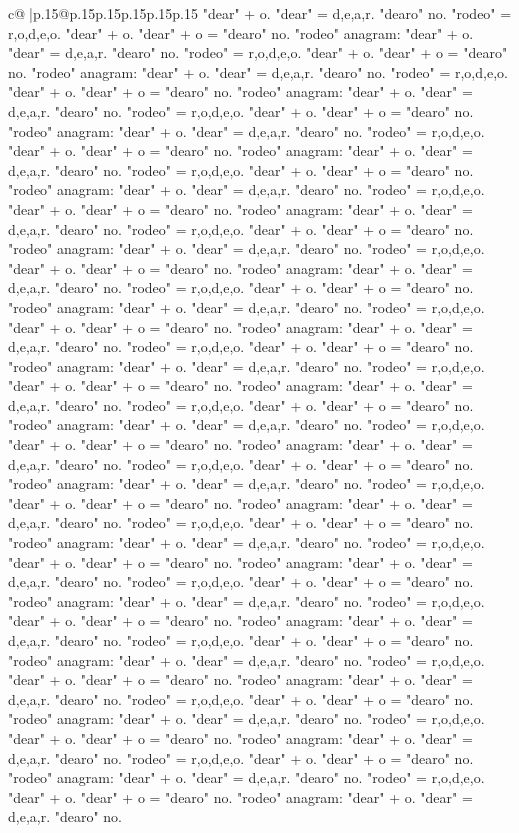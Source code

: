 \documentclass{article}
\begin{document}
{\begin{supertabular}{c@{$\;$}|p{.15\linewidth}@{}p{.15\linewidth}p{.15\linewidth}p{.15\linewidth}p{.15\linewidth}p{.15\linewidth}}
{{{"dear" + o. "dear" = d,e,a,r. "dearo" no. "rodeo" = r,o,d,e,o. "dear" + o. "dear" + o = "dearo" no. "rodeo" anagram: "dear" + o. "dear" = d,e,a,r. "dearo" no. "rodeo" = r,o,d,e,o. "dear" + o. "dear" + o = "dearo" no. "rodeo" anagram: "dear" + o. "dear" = d,e,a,r. "dearo" no. "rodeo" = r,o,d,e,o. "dear" + o. "dear" + o = "dearo" no. "rodeo" anagram: "dear" + o. "dear" = d,e,a,r. "dearo" no. "rodeo" = r,o,d,e,o. "dear" + o. "dear" + o = "dearo" no. "rodeo" anagram: "dear" + o. "dear" = d,e,a,r. "dearo" no. "rodeo" = r,o,d,e,o. "dear" + o. "dear" + o = "dearo" no. "rodeo" anagram: "dear" + o. "dear" = d,e,a,r. "dearo" no. "rodeo" = r,o,d,e,o. "dear" + o. "dear" + o = "dearo" no. "rodeo" anagram: "dear" + o. "dear" = d,e,a,r. "dearo" no. "rodeo" = r,o,d,e,o. "dear" + o. "dear" + o = "dearo" no. "rodeo" anagram: "dear" + o. "dear" = d,e,a,r. "dearo" no. "rodeo" = r,o,d,e,o. "dear" + o. "dear" + o = "dearo" no. "rodeo" anagram: "dear" + o. "dear" = d,e,a,r. "dearo" no. "rodeo" = r,o,d,e,o. "dear" + o. "dear" + o = "dearo" no. "rodeo" anagram: "dear" + o. "dear" = d,e,a,r. "dearo" no. "rodeo" = r,o,d,e,o. "dear" + o. "dear" + o = "dearo" no. "rodeo" anagram: "dear" + o. "dear" = d,e,a,r. "dearo" no. "rodeo" = r,o,d,e,o. "dear" + o. "dear" + o = "dearo" no. "rodeo" anagram: "dear" + o. "dear" = d,e,a,r. "dearo" no. "rodeo" = r,o,d,e,o. "dear" + o. "dear" + o = "dearo" no. "rodeo" anagram: "dear" + o. "dear" = d,e,a,r. "dearo" no. "rodeo" = r,o,d,e,o. "dear" + o. "dear" + o = "dearo" no. "rodeo" anagram: "dear" + o. "dear" = d,e,a,r. "dearo" no. "rodeo" = r,o,d,e,o. "dear" + o. "dear" + o = "dearo" no. "rodeo" anagram: "dear" + o. "dear" = d,e,a,r. "dearo" no. "rodeo" = r,o,d,e,o. "dear" + o. "dear" + o = "dearo" no. "rodeo" anagram: "dear" + o. "dear" = d,e,a,r. "dearo" no. "rodeo" = r,o,d,e,o. "dear" + o. "dear" + o = "dearo" no. "rodeo" anagram: "dear" + o. "dear" = d,e,a,r. "dearo" no. "rodeo" = r,o,d,e,o. "dear" + o. "dear" + o = "dearo" no. "rodeo" anagram: "dear" + o. "dear" = d,e,a,r. "dearo" no. "rodeo" = r,o,d,e,o. "dear" + o. "dear" + o = "dearo" no. "rodeo" anagram: "dear" + o. "dear" = d,e,a,r. "dearo" no. "rodeo" = r,o,d,e,o. "dear" + o. "dear" + o = "dearo" no. "rodeo" anagram: "dear" + o. "dear" = d,e,a,r. "dearo" no. "rodeo" = r,o,d,e,o. "dear" + o. "dear" + o = "dearo" no. "rodeo" anagram: "dear" + o. "dear" = d,e,a,r. "dearo" no. "rodeo" = r,o,d,e,o. "dear" + o. "dear" + o = "dearo" no. "rodeo" anagram: "dear" + o. "dear" = d,e,a,r. "dearo" no. "rodeo" = r,o,d,e,o. "dear" + o. "dear" + o = "dearo" no. "rodeo" anagram: "dear" + o. "dear" = d,e,a,r. "dearo" no. "rodeo" = r,o,d,e,o. "dear" + o. "dear" + o = "dearo" no. "rodeo" anagram: "dear" + o. "dear" = d,e,a,r. "dearo" no. "rodeo" = r,o,d,e,o. "dear" + o. "dear" + o = "dearo" no. "rodeo" anagram: "dear" + o. "dear" = d,e,a,r. "dearo" no. "rodeo" = r,o,d,e,o. "dear" + o. "dear" + o = "dearo" no. "rodeo" anagram: "dear" + o. "dear" = d,e,a,r. "dearo" no. "rodeo" = r,o,d,e,o. "dear" + o. "dear" + o = "dearo" no. "rodeo" anagram: "dear" + o. "dear" = d,e,a,r. "dearo" no. "rodeo" = r,o,d,e,o. "dear" + o. "dear" + o = "dearo" no. "rodeo" anagram: "dear" + o. "dear" = d,e,a,r. "dearo" no. }}}
\end{supertabular}}
\end{document}
